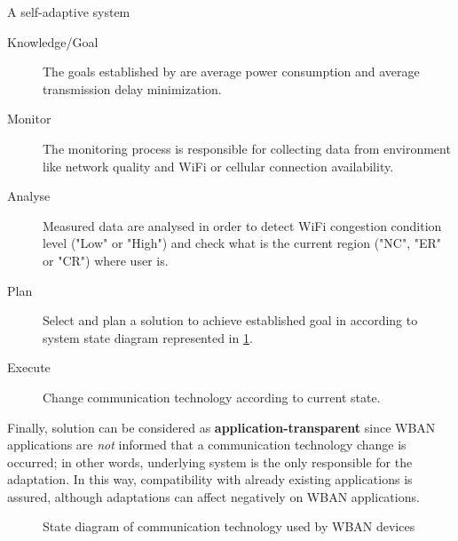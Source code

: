 \documentclass[10pt]{beamer}
\begin{document}
\begin{frame}{A self-adaptive system}
\begin{description}
\item[Knowledge/Goal] The goals established by \citet{MSAReport} are average power consumption and average transmission delay minimization.

\item[Monitor] The monitoring process is responsible for collecting data from environment like network quality and WiFi or cellular connection availability. 

\item[Analyse] Measured data are analysed in order to detect WiFi congestion condition level ("Low" or "High") and check what is the current region ("NC", "ER" or "CR") where user is.

\item[Plan] Select and plan a solution to achieve established goal in according to system state diagram represented in \ref{fig:Chain}. 

\item[Execute] Change communication technology according to current state.

\end{description}

Finally, \citet{MSAReport} solution can be considered as \textbf{application-transparent} since WBAN applications are \textit{not} informed that a communication technology change is occurred; in other words, underlying system is the only responsible for the adaptation. In this way, compatibility with already existing applications is assured, although adaptations can affect negatively on WBAN applications. 

\begin{figure}
\caption{State diagram of communication technology used by WBAN devices} \label{fig:Chain}
\end{figure}
\end{frame}
\end{document}
